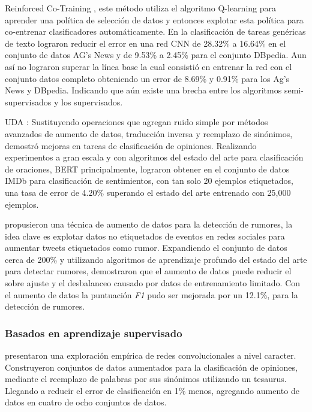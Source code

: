 Reinforced Co-Training \cite{wu2018reinforced}, este método utiliza el algoritmo Q-learning para aprender una política de selección de datos y entonces explotar esta política para co-entrenar clasificadores automáticamente. En la clasificación de tareas genéricas de texto lograron reducir el error en una red CNN de 28.32\% a 16.64\% en el conjunto de datos AG's News y  de 9.53\% a 2.45\% para el conjunto DBpedia. Aun así no lograron superar la línea base la cual consistió en entrenar la red con el conjunto datos completo obteniendo un error de 8.69\% y 0.91\% para los Ag's News y DBpedia. Indicando que aún existe una brecha entre los algoritmos semi-supervisados y los supervisados.

UDA \cite{xie2019unsupervised}: Sustituyendo operaciones que agregan ruido simple por métodos avanzados de aumento de datos, traducción inversa y reemplazo de sinónimos, demostró mejoras en tareas de clasificación de opiniones. Realizando experimentos a gran escala y con algoritmos del estado del arte para clasificación de oraciones, BERT principalmente, lograron obtener en el conjunto de datos IMDb para clasificación de sentimientos, con tan solo 20 ejemplos etiquetados, una tasa de error de 4.20\% superando el estado del arte entrenado con 25,000 ejemplos. 

\cite{han2019neural} propusieron una técnica de aumento de datos para la detección de rumores, la idea clave es explotar datos no etiquetados de eventos en redes sociales para aumentar tweets etiquetados como rumor. Expandiendo el conjunto de datos cerca de 200\% y utilizando algoritmos de aprendizaje profundo del estado del arte para detectar rumores, demostraron que el aumento de datos puede reducir el sobre ajuste y el desbalanceo causado por datos de entrenamiento limitado. Con el aumento de datos la puntuación \textit{F1} pudo ser mejorada por un 12.1\%, para la detección de rumores.

\subsubsection{Basados en aprendizaje supervisado}

\cite{zhang2015character} presentaron una exploración empírica de redes convolucionales a nivel caracter. Construyeron conjuntos de datos aumentados para la clasificación de opiniones, mediante el reemplazo de palabras por sus sinónimos utilizando un tesaurus. Llegando a reducir el error de clasificación en 1\% menos, agregando aumento de datos en cuatro de ocho conjuntos de datos.

